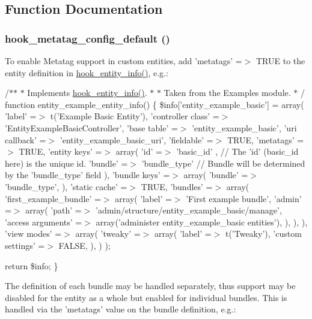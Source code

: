 \subsection{Function Documentation}
\hypertarget{metatag_8api_8php_a4e5a48ac435a77ef5372964d28ad7c36}{
\subsubsection[{hook\_\-metatag\_\-config\_\-default}]{\setlength{\rightskip}{0pt plus 5cm}hook\_\-metatag\_\-config\_\-default ()}}
\label{metatag_8api_8php_a4e5a48ac435a77ef5372964d28ad7c36}
To enable Metatag support in custom entities, add 'metatags' =$>$ TRUE to the entity definition in \hyperlink{group__hooks_gaf02318e9d0e8cdbf6d187b271b9969a8}{hook\_\-entity\_\-info()}, e.g.:

/$\ast$$\ast$ $\ast$ Implements \hyperlink{group__hooks_gaf02318e9d0e8cdbf6d187b271b9969a8}{hook\_\-entity\_\-info()}. $\ast$ $\ast$ Taken from the Examples module. $\ast$ / function entity\_\-example\_\-entity\_\-info() \{ \$info\mbox{[}'entity\_\-example\_\-basic'\mbox{]} = array( 'label' =$>$ t('Example Basic Entity'), 'controller class' =$>$ 'EntityExampleBasicController', 'base table' =$>$ 'entity\_\-example\_\-basic', 'uri callback' =$>$ 'entity\_\-example\_\-basic\_\-uri', 'fieldable' =$>$ TRUE, 'metatags' =$>$ TRUE, 'entity keys' =$>$ array( 'id' =$>$ 'basic\_\-id' , // The 'id' (basic\_\-id here) is the unique id. 'bundle' =$>$ 'bundle\_\-type' // Bundle will be determined by the 'bundle\_\-type' field ), 'bundle keys' =$>$ array( 'bundle' =$>$ 'bundle\_\-type', ), 'static cache' =$>$ TRUE, 'bundles' =$>$ array( 'first\_\-example\_\-bundle' =$>$ array( 'label' =$>$ 'First example bundle', 'admin' =$>$ array( 'path' =$>$ 'admin/structure/entity\_\-example\_\-basic/manage', 'access arguments' =$>$ array('administer entity\_\-example\_\-basic entities'), ), ), ), 'view modes' =$>$ array( 'tweaky' =$>$ array( 'label' =$>$ t('Tweaky'), 'custom settings' =$>$ FALSE, ), ) );

return \$info; \}

The definition of each bundle may be handled separately, thus support may be disabled for the entity as a whole but enabled for individual bundles. This is handled via the 'metatags' value on the bundle definition, e.g.:

